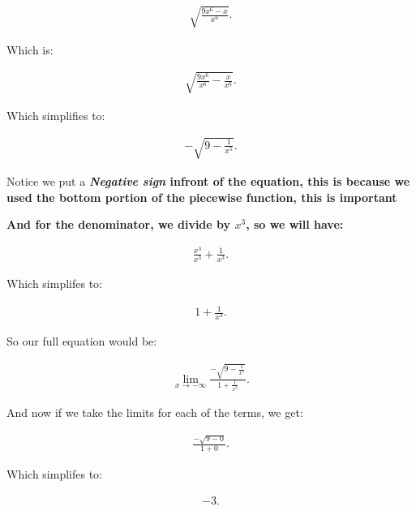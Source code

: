 \documentclass{report}
\begin{document}
        \begin{align*}
            \sqrt{ \frac{9x^6-x}{x^6}} 
        .\end{align*}

        \bigbreak \noindent 
        Which is:
        
        \begin{align*}
            \sqrt{ \frac{9x^6}{x^6} - \frac{x}{x^6}}
        .\end{align*}

        \bigbreak \noindent 
        Which simplifies to:

        \begin{align*}
            -\sqrt{9 - \frac{1}{x^5}}
        .\end{align*}

        \bigbreak \noindent 
        Notice we put a \textbf{\textit{Negative sign} infront of the equation, this is because we
            used the bottom portion of the piecewise function, this is important
        }

        \bigbreak \noindent 
        \textbf{And for the denominator, we divide by $x^3$, so we will have:}

        \begin{align*}
            \frac{x^3}{x^3} + \frac{1}{x^3}
        .\end{align*}

        \bigbreak \noindent 
        Which simplifes to:
        
        \begin{align*}
            1 + \frac{1}{x^3}
        .\end{align*}

        \bigbreak \noindent 
        So our full equation would be:

        \begin{align*}
            \lim\limits_{x \to - \infty}{ \frac{- \sqrt{9- \frac{1}{x^5}}}{1 + \frac{1}{x^3}}}
        .\end{align*}

        \bigbreak \noindent 
        And now if we take the limits for each of the terms, we get:

        \begin{align*}
            \frac{- \sqrt{9 - 0}}{1 + 0}
        .\end{align*}

        \bigbreak \noindent 
        Which simplifes to:

        \begin{align*}
            -3
        .\end{align*}
\end{document}
